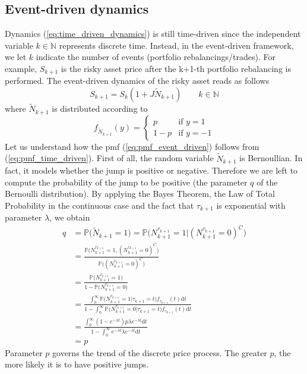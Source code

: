 \subsection{Event-driven dynamics}
Dynamics (\ref{eq:time_driven_dynamics}) is still time-driven since the independent variable $k \in \mathbb{N}$ represents discrete time. Instead, in the event-driven framework, we let $k$ indicate the number of events (portfolio rebalancings/trades). For example, $S_{k+1}$ is the risky asset price after the k+1-th portfolio rebalancing is performed. The event-driven dynamics of the risky asset reads as follows
\begin{equation}\label{eq:event_driven_dynamics}
S_{k+1} = S_{k}(1+J \widetilde{N}_{k+1}) \qquad k \in \mathbb{N}
\end{equation}
where $\widetilde{N}_{k+1}$ is distributed according to 
\begin{equation}\label{eq:pmf_event_driven}
f_{\widetilde{N}_{k+1}}(y)  = 
\begin{cases}
p & \text{if } y = 1 \\
1-p & \text{if } y = -1
\end{cases}
\end{equation}
Let us understand how the pmf (\ref{eq:pmf_event_driven}) follows from (\ref{eq:pmf_time_driven}). First of all, the random variable $\widetilde{N}_{k+1}$ is Bernoullian. In fact, it models whether the jump is positive or negative. Therefore we are left to compute the probability of the jump to be positive (the parameter $q$ of the Bernoulli distribution). By applying the Bayes Theorem, the Law of Total Probability in the continuous case and the fact that $\tau_{k+1}$ is exponential with parameter $\lambda$, we obtain
\begin{align*}
q &= \mathbb{P}\big(\widetilde{N}_{k+1} = 1\big) = \mathbb{P}\big(N_{k+1}^{\tau_{k+1}}=1\lvert(N_{k+1}^{\tau_{k+1}}=0)^C\big)\\[1.5ex]
& = \frac{\mathbb{P}\big(N_{k+1}^{\tau_{k+1}}=1,(N_{k+1}^{\tau_{k+1}}=0)^C\big)}{\mathbb{P}\big((N_{k+1}^{\tau_{k+1}}=0)^C\big)}\\[1ex]
&=\frac{\mathbb{P}\big(N_{k+1}^{\tau_{k+1}}=1\big)}{1-\mathbb{P}\big(N_{k+1}^{\tau_{k+1}}=0\big)}\\[1.5ex]
& = \frac{\int_{0}^{\infty}\mathbb{P}\big(N_{k+1}^{\tau_{k+1}} = 1\lvert\tau_{k+1}=t\big)f_{\tau_{k+1}}(t)\mathrm{d}t}{1-\int_{0}^{\infty}\mathbb{P}\big(N_{k+1}^{\tau_{k+1}} = 0\lvert\tau_{k+1}=t\big)f_{\tau_{k+1}}(t)\mathrm{d}t}\\[1.5ex]
& = \frac{\int_{0}^{\infty}(1-e^{-\lambda t})p\lambda e^{-\lambda t} \mathrm{d}t  }{1-\int_{0}^{\infty}e^{-\lambda t}\lambda e^{-\lambda t}\mathrm{d}t } \\[1.5ex]
& = p
\end{align*}
Parameter $p$ governs the trend of the discrete price process. The greater $p$, the more likely it is to have positive jumps.

